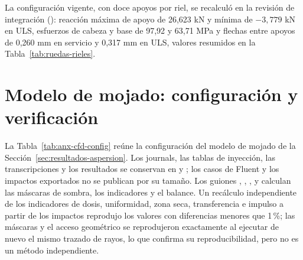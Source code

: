La configuración vigente, con doce apoyos por riel, se recalculó en la revisión de integración (): reacción máxima de apoyo de 26,623 kN y mínima de $-3{,}779$ kN en ULS, esfuerzos de cabeza y base de 97,92 y 63,71 MPa y flechas entre apoyos de 0,260 mm en servicio y 0,317 mm en ULS, valores resumidos en la Tabla~\ref{tab:ruedas-rieles}.

\section{Modelo de mojado: configuración y verificación}
\label{sec:anx-cfd}

La Tabla~\ref{tab:anx-cfd-config} reúne la configuración del modelo de mojado de la Sección~\ref{sec:resultados-aspersion}. Los journals, las tablas de inyección, las transcripciones y los resultados se conservan en  y ; los casos de Fluent y los impactos exportados no se publican por su tamaño. Los guiones , , ,  y  calculan las máscaras de sombra, los indicadores y el balance. Un recálculo independiente de los indicadores de dosis, uniformidad, zona seca, transferencia e impulso a partir de los impactos reprodujo los valores con diferencias menores que 1\,\%; las máscaras y el acceso geométrico se reprodujeron exactamente al ejecutar de nuevo el mismo trazado de rayos, lo que confirma su reproducibilidad, pero no es un método independiente.

